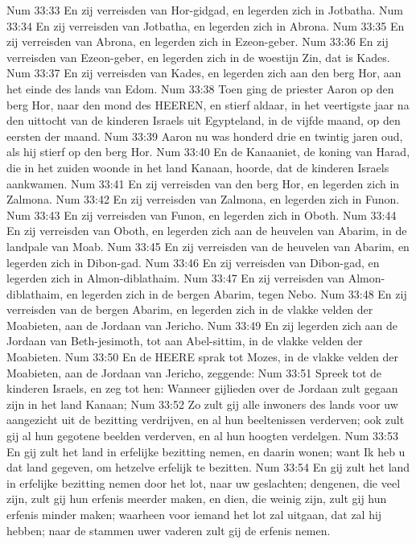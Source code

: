 Num 33:33  En zij verreisden van Hor-gidgad, en legerden zich in Jotbatha.
Num 33:34  En zij verreisden van Jotbatha, en legerden zich in Abrona.
Num 33:35  En zij verreisden van Abrona, en legerden zich in Ezeon-geber.
Num 33:36  En zij verreisden van Ezeon-geber, en legerden zich in de woestijn Zin, dat is Kades.
Num 33:37  En zij verreisden van Kades, en legerden zich aan den berg Hor, aan het einde des lands van Edom.
Num 33:38  Toen ging de priester Aaron op den berg Hor, naar den mond des HEEREN, en stierf aldaar, in het veertigste jaar na den uittocht van de kinderen Israels uit Egypteland, in de vijfde maand, op den eersten der maand.
Num 33:39  Aaron nu was honderd drie en twintig jaren oud, als hij stierf op den berg Hor.
Num 33:40  En de Kanaaniet, de koning van Harad, die in het zuiden woonde in het land Kanaan, hoorde, dat de kinderen Israels aankwamen.
Num 33:41  En zij verreisden van den berg Hor, en legerden zich in Zalmona.
Num 33:42  En zij verreisden van Zalmona, en legerden zich in Funon.
Num 33:43  En zij verreisden van Funon, en legerden zich in Oboth.
Num 33:44  En zij verreisden van Oboth, en legerden zich aan de heuvelen van Abarim, in de landpale van Moab.
Num 33:45  En zij verreisden van de heuvelen van Abarim, en legerden zich in Dibon-gad.
Num 33:46  En zij verreisden van Dibon-gad, en legerden zich in Almon-diblathaim.
Num 33:47  En zij verreisden van Almon-diblathaim, en legerden zich in de bergen Abarim, tegen Nebo.
Num 33:48  En zij verreisden van de bergen Abarim, en legerden zich in de vlakke velden der Moabieten, aan de Jordaan van Jericho.
Num 33:49  En zij legerden zich aan de Jordaan van Beth-jesimoth, tot aan Abel-sittim, in de vlakke velden der Moabieten.
Num 33:50  En de HEERE sprak tot Mozes, in de vlakke velden der Moabieten, aan de Jordaan van Jericho, zeggende:
Num 33:51  Spreek tot de kinderen Israels, en zeg tot hen: Wanneer gijlieden over de Jordaan zult gegaan zijn in het land Kanaan;
Num 33:52  Zo zult gij alle inwoners des lands voor uw aangezicht uit de bezitting verdrijven, en al hun beeltenissen verderven; ook zult gij al hun gegotene beelden verderven, en al hun hoogten verdelgen.
Num 33:53  En gij zult het land in erfelijke bezitting nemen, en daarin wonen; want Ik heb u dat land gegeven, om hetzelve erfelijk te bezitten.
Num 33:54  En gij zult het land in erfelijke bezitting nemen door het lot, naar uw geslachten; dengenen, die veel zijn, zult gij hun erfenis meerder maken, en dien, die weinig zijn, zult gij hun erfenis minder maken; waarheen voor iemand het lot zal uitgaan, dat zal hij hebben; naar de stammen uwer vaderen zult gij de erfenis nemen.
